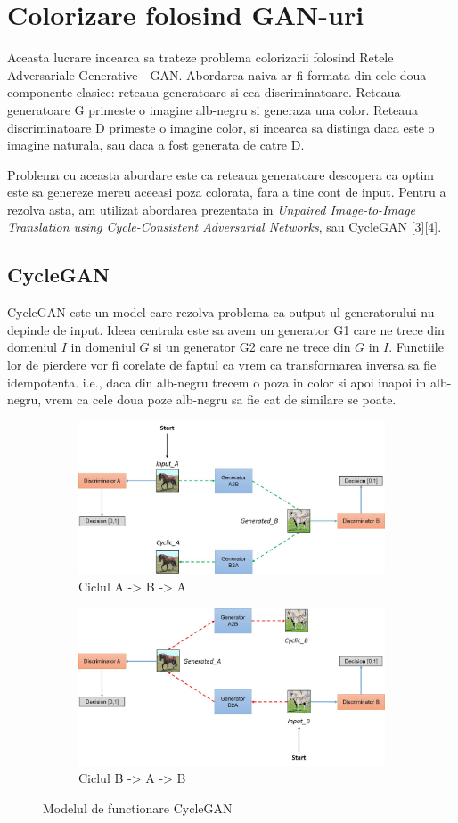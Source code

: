 \documentclass[12pt]{article}
\theoremstyle{definition}
\begin{document}
\section{Colorizare folosind GAN-uri}

Aceasta lucrare incearca sa trateze problema colorizarii folosind Retele Adversariale Generative - GAN.
Abordarea naiva ar fi formata din cele doua componente clasice: reteaua generatoare si cea discriminatoare.
Reteaua generatoare G primeste o imagine alb-negru si generaza una color.
Reteaua discriminatoare D primeste o imagine color, si incearca sa distinga daca este o imagine naturala, sau daca a fost generata de catre D.

Problema cu aceasta abordare este ca reteaua generatoare descopera ca optim este sa genereze mereu aceeasi poza colorata, fara a tine cont de input. Pentru a rezolva asta, am utilizat abordarea prezentata in \textit{Unpaired Image-to-Image Translation using Cycle-Consistent Adversarial Networks}, sau CycleGAN [3][4].

\subsection{CycleGAN}

CycleGAN este un model care rezolva problema ca output-ul generatorului nu depinde de input.
Ideea centrala este sa avem un generator G1 care ne trece din domeniul $I$ in domeniul $G$ si un generator G2 care ne trece din $G$ in $I$.
Functiile lor de pierdere vor fi corelate de faptul ca vrem ca transformarea inversa sa fie idempotenta.
i.e., daca din alb-negru trecem o poza in color si apoi inapoi in alb-negru, vrem ca cele doua poze alb-negru sa fie cat de similare se poate.

\begin{figure}
  \centering

	\begin{subfigure}{0.4\textwidth}
		\includegraphics[width=0.5\linewidth]{model.jpg}
		\caption{Ciclul A -> B -> A}
	\end{subfigure}

	\begin{subfigure}{0.4\textwidth}
		\includegraphics[width=0.5\linewidth]{model1.jpg}
		\caption{Ciclul B -> A -> B}
	\end{subfigure}

  \caption{Modelul de functionare CycleGAN}
  \label{fig:architecture}
\end{figure}
\end{document}
